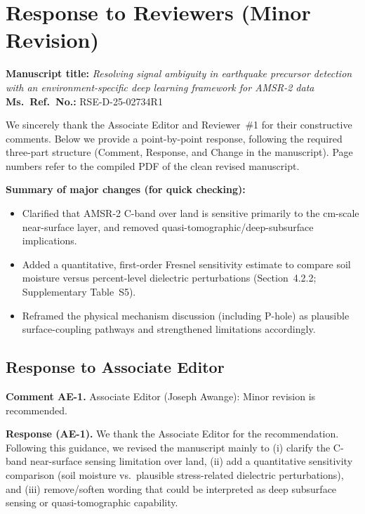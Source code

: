 \documentclass[11pt]{article}
\newcommand{\revcomment}[1]{\begingroup\color{commentcolor}#1\endgroup}
\newcommand{\revresponse}[1]{\begingroup\color{responsecolor}#1\endgroup}
\begin{document}
\clearpage

\section*{Response to Reviewers (Minor Revision)}

\textbf{Manuscript title:} \textit{Resolving signal ambiguity in earthquake precursor detection with an environment-specific deep learning framework for AMSR-2 data}\\
\textbf{Ms.\ Ref.\ No.:} RSE-D-25-02734R1

\medskip

We sincerely thank the Associate Editor and Reviewer~\#1 for their constructive comments. Below we provide a point-by-point response, following the required three-part structure (Comment, Response, and Change in the manuscript). Page numbers refer to the compiled PDF of the clean revised manuscript.

\medskip

\noindent\textbf{Summary of major changes (for quick checking):}
\begin{itemize}[leftmargin=*, nosep]
  \item Clarified that AMSR-2 C-band over land is sensitive primarily to the cm-scale near-surface layer, and removed quasi-tomographic/deep-subsurface implications.
  \item Added a quantitative, first-order Fresnel sensitivity estimate to compare soil moisture versus percent-level dielectric perturbations (Section~4.2.2; Supplementary Table~S5).
  \item Reframed the physical mechanism discussion (including P-hole) as plausible surface-coupling pathways and strengthened limitations accordingly.
\end{itemize}

\bigskip

\subsection*{Response to Associate Editor}

\revcomment{%
\textbf{Comment AE-1.}
Associate Editor (Joseph Awange): Minor revision is recommended.
}

\revresponse{%
\textbf{Response (AE-1).}
We thank the Associate Editor for the recommendation. Following this guidance, we revised the manuscript mainly to (i) clarify the C-band near-surface sensing limitation over land, (ii) add a quantitative sensitivity comparison (soil moisture vs.\ plausible stress-related dielectric perturbations), and (iii) remove/soften wording that could be interpreted as deep subsurface sensing or quasi-tomographic capability.
}
\end{document}
